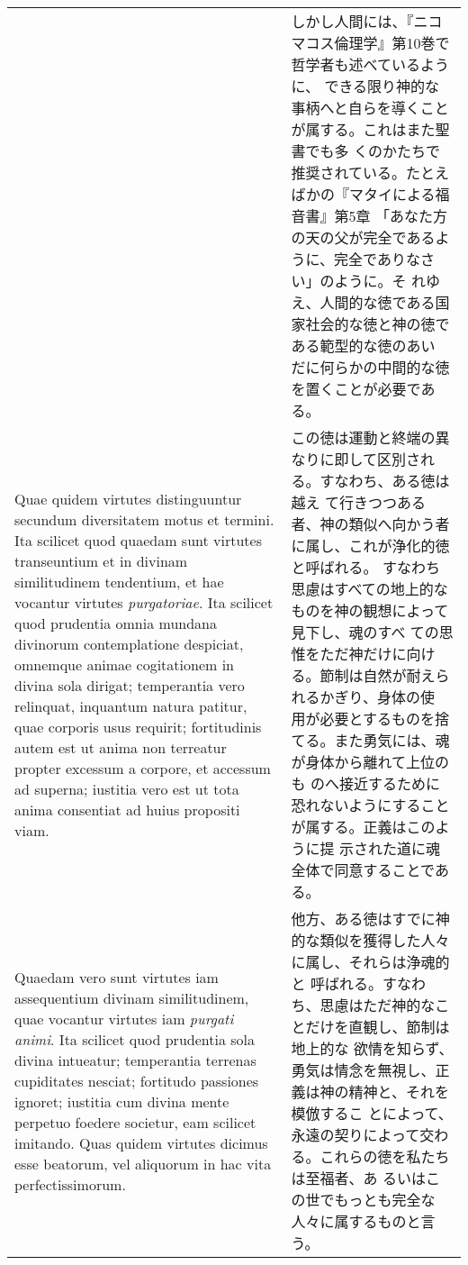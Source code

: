 \documentclass[10pt]{jsarticle}
\begin{document}
\begin{longtable}{p{21em}p{21em}}
&

 しかし人間には、『ニコマコス倫理学』第10巻で哲学者も述べているように、
 できる限り神的な事柄へと自らを導くことが属する。これはまた聖書でも多
 くのかたちで推奨されている。たとえばかの『マタイによる福音書』第5章
 「あなた方の天の父が完全であるように、完全でありなさい」のように。そ
 れゆえ、人間的な徳である国家社会的な徳と神の徳である範型的な徳のあい
 だに何らかの中間的な徳を置くことが必要である。

 
\\


 Quae quidem virtutes distinguuntur secundum diversitatem motus et
 termini. Ita scilicet quod quaedam sunt virtutes transeuntium et in
 divinam similitudinem tendentium, et hae vocantur virtutes {\itshape
 purgatoriae}. Ita scilicet quod prudentia omnia mundana divinorum
 contemplatione despiciat, omnemque animae cogitationem in divina sola
 dirigat; temperantia vero relinquat, inquantum natura patitur, quae
 corporis usus requirit; fortitudinis autem est ut anima non terreatur
 propter excessum a corpore, et accessum ad superna; iustitia vero est
 ut tota anima consentiat ad huius propositi viam.

&

 この徳は運動と終端の異なりに即して区別される。すなわち、ある徳は越え
 て行きつつある者、神の類似へ向かう者に属し、これが浄化的徳と呼ばれる。
 すなわち思慮はすべての地上的なものを神の観想によって見下し、魂のすべ
 ての思惟をただ神だけに向ける。節制は自然が耐えられるかぎり、身体の使
 用が必要とするものを捨てる。また勇気には、魂が身体から離れて上位のも
 のへ接近するために恐れないようにすることが属する。正義はこのように提
 示された道に魂全体で同意することである。

 
\\


 Quaedam vero sunt virtutes iam assequentium divinam similitudinem,
 quae vocantur virtutes iam {\itshape purgati animi}. Ita scilicet
 quod prudentia sola divina intueatur; temperantia terrenas
 cupiditates nesciat; fortitudo passiones ignoret; iustitia cum divina
 mente perpetuo foedere societur, eam scilicet imitando. Quas quidem
 virtutes dicimus esse beatorum, vel aliquorum in hac vita
 perfectissimorum.


&

 他方、ある徳はすでに神的な類似を獲得した人々に属し、それらは浄魂的と
 呼ばれる。すなわち、思慮はただ神的なことだけを直観し、節制は地上的な
 欲情を知らず、勇気は情念を無視し、正義は神の精神と、それを模倣するこ
 とによって、永遠の契りによって交わる。これらの徳を私たちは至福者、あ
 るいはこの世でもっとも完全な人々に属するものと言う。
 

\end{longtable}
\end{document}
